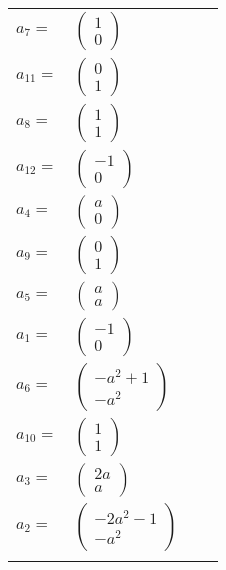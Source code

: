 \documentclass[1p]{elsarticle_modified}
\theoremstyle{definition}
\begin{document}
\begin{tabular}{m{7pt} m{180pt} m{7pt} m{180pt} }
\flushright $a_{7}=$&$\begin{pmatrix}1\\0\end{pmatrix}$ \\
\flushright $a_{11}=$&$\begin{pmatrix}0\\1\end{pmatrix}$ \\
\flushright $a_{8}=$&$\begin{pmatrix}1\\1\end{pmatrix}$ \\
\flushright $a_{12}=$&$\begin{pmatrix}-1\\0\end{pmatrix}$ \\
\flushright $a_{4}=$&$\begin{pmatrix}a\\0\end{pmatrix}$ \\
\flushright $a_{9}=$&$\begin{pmatrix}0\\1\end{pmatrix}$ \\
\flushright $a_{5}=$&$\begin{pmatrix}a\\a\end{pmatrix}$ \\
\flushright $a_{1}=$&$\begin{pmatrix}-1\\0\end{pmatrix}$ \\
\flushright $a_{6}=$&$\begin{pmatrix}- a^2+1\\- a^2\end{pmatrix}$ \\
\flushright $a_{10}=$&$\begin{pmatrix}1\\1\end{pmatrix}$ \\
\flushright $a_{3}=$&$\begin{pmatrix}2 a\\a\end{pmatrix}$ \\
\flushright $a_{2}=$&$\begin{pmatrix}-2 a^2-1\\- a^2\end{pmatrix}$\\&\end{tabular}
\end{document}
